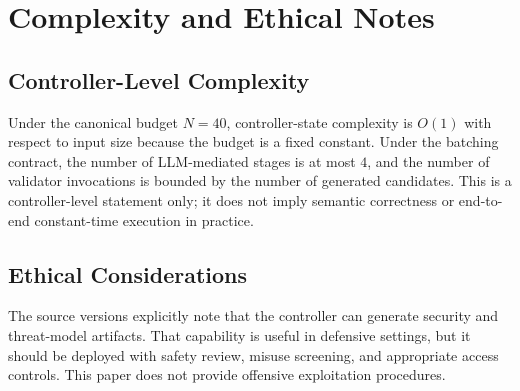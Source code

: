 \documentclass[11pt,a4paper]{article}
\numberwithin{equation}{section}
\theoremstyle{definition}
\begin{document}
\section{Complexity and Ethical Notes}

\subsection{Controller-Level Complexity}

Under the canonical budget \(N=40\), controller-state complexity is \(O(1)\) with respect to input size because the budget is a fixed constant. Under the batching contract, the number of LLM-mediated stages is at most \(4\), and the number of validator invocations is bounded by the number of generated candidates. This is a controller-level statement only; it does not imply semantic correctness or end-to-end constant-time execution in practice.

\subsection{Ethical Considerations}

The source versions explicitly note that the controller can generate security and threat-model artifacts. That capability is useful in defensive settings, but it should be deployed with safety review, misuse screening, and appropriate access controls. This paper does not provide offensive exploitation procedures.
\end{document}
